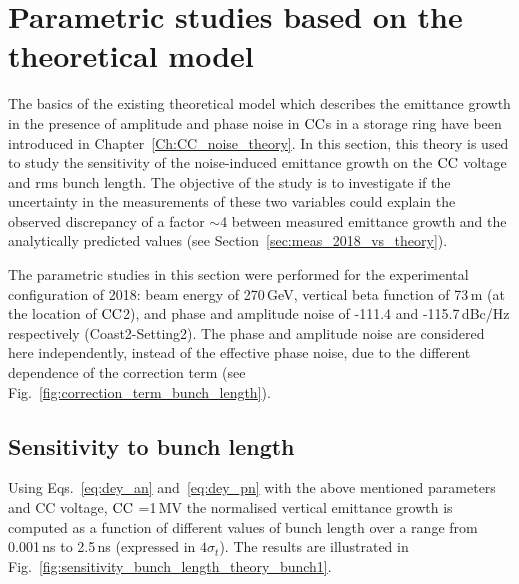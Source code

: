 \section{Parametric studies based on the theoretical model}\label{sec:paramteric_studies_theory}

The basics of the existing theoretical model which describes the emittance growth in the presence of amplitude and phase noise in ${\mathrm{CC}}$s in a storage ring have been introduced in Chapter~\ref{Ch:CC_noise_theory}. In this section, this theory is used to study the sensitivity of the noise-induced emittance growth on the ${\mathrm{CC}}$ voltage and rms bunch length. The objective of the study is to investigate if the uncertainty in the measurements of these two variables could explain the observed discrepancy of a factor $\sim$4 between measured emittance growth and the analytically predicted values (see Section~\ref{sec:meas_2018_vs_theory}).

The parametric studies in this section were performed for the experimental configuration of 2018: beam energy of 270\,GeV, vertical beta function of 73\,m (at the location of ${\mathrm{CC}}$2), and phase and amplitude noise of -111.4 and -115.7\,dBc/Hz respectively (Coast2-Setting2). The phase and amplitude noise are considered here independently, instead of the effective phase noise, due to the different dependence of the correction term (see Fig.~\ref{fig:correction_term_bunch_length}).

\subsection{Sensitivity to bunch length}\label{subsec:bunch_length_dependence}
Using Eqs.~\eqref{eq:dey_an} and~\eqref{eq:dey_pn} with the above mentioned parameters and CC voltage, ${\mathrm{CC}}$
=1\,MV the normalised vertical emittance growth is computed as a function of different values of bunch length over a range from 0.001\,ns to 2.5\,ns (expressed in $4\sigma_t$). The results are illustrated in Fig.~\ref{fig:sensitivity_bunch_length_theory_bunch1}. 

